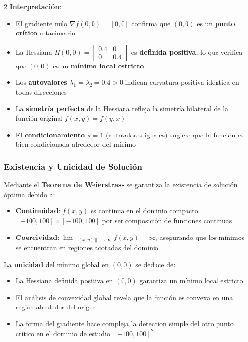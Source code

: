 \documentclass[11pt, a4paper, twocolumn]{beamer}
\begin{document}
  \begin{multicols}{2}
 \textbf{Interpretación}: 
 \begin{itemize}
 	\item El gradiente nulo $\nabla f(0,0) = [0, 0]$ confirma que $(0,0)$ es un \textbf{punto crítico} estacionario
 	\item La Hessiana $H(0,0) = \begin{bmatrix} 0.4 & 0 \\ 0 & 0.4 \end{bmatrix}$ es \textbf{definida positiva}, lo que verifica que $(0,0)$ es un \textbf{mínimo local estricto}
 	\item Los \textbf{autovalores} $\lambda_1 = \lambda_2 = 0.4 > 0$ indican curvatura positiva idéntica en todas direcciones
 	\item La \textbf{simetría perfecta} de la Hessiana refleja la simetría bilateral de la función original $f(x,y) = f(y,x)$
 	\item El \textbf{condicionamiento} $\kappa = 1$ (autovalores iguales) sugiere que la función es bien condicionada alrededor del mínimo
 \end{itemize}
 
 \subsubsection{Existencia y Unicidad de Solución}
 
 Mediante el \textbf{Teorema de Weierstrass} se garantiza la existencia de solución óptima debido a:
 \begin{itemize}
 	\item \textbf{Continuidad}: $f(x,y)$ es continua en el dominio compacto $[-100, 100] \times [-100, 100]$ por ser composición de funciones continuas
 	\item \textbf{Coercividad}: $\lim_{\|(x,y)\| \to \infty} f(x,y) = \infty$, asegurando que los mínimos se encuentran en regiones acotadas del dominio
 \end{itemize}
 
 La \textbf{unicidad} del mínimo global en $(0,0)$ se deduce de:
 \begin{itemize}
 	\item La Hessiana definida positiva en $(0,0)$ garantiza un mínimo local estricto
 	\item El análisis de convexidad global revela que la función es convexa en una región alrededor del origen
 	\item La forma del gradiente hace compleja la deteccion simple del otro punto crítico en el dominio de estudio $[-100, 100]^2$
 \end{itemize}


\end{multicols}
\end{document}
